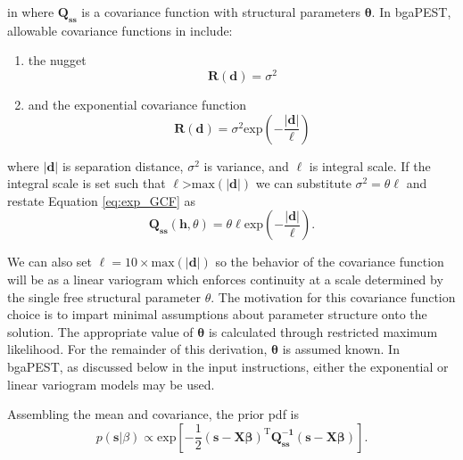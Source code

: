\documentclass[11pt,oneside,onecolumn]{usgsreport}
\begin{document}
\begin{appendix}
\begin{bibunit}
 in
where $\mathbf{Q_{ss}}$ is a covariance function with structural
parameters $\mathbf{\theta}.$ In bgaPEST, allowable covariance functions
 in
include:
\begin{enumerate}
\item the nugget
\[
\mathbf{R}\left(\mathbf{d}\right)=\sigma^{2}
\]

\item and the exponential covariance function 
\begin{equation}
\mathbf{R}(\mathbf{d})=\sigma^{2}\mathrm{exp}(\mathbf{-}\frac{\left|\mathbf{d}\right|}{\ell})\label{eq:exp_GCF}
\end{equation}

\end{enumerate}
where $\left|\mathbf{d}\right|$ is separation distance, $\sigma^{2}$
is variance, and $\ell$ is integral scale. If the integral scale
is set such that $\ell$>$\mathrm{max}(\left|\mathbf{d}\right|)$ we
can substitute $\sigma^{2}=\theta\ell$ and restate Equation \ref{eq:exp_GCF}
as
\begin{equation}
\mathbf{Q_{ss}}(\mathbf{h},\theta)=\theta\ell\mathrm{exp}(-\frac{\mathbf{\left|\mathbf{d}\right|}}{\ell})\label{eq:Qss}.
\end{equation}


We can also set $\ell=10\times\mathrm{max(\mathbf{\left|d\right|})}$
so the behavior of the covariance function will be as a linear variogram
\citep{FienenWRR2008} which enforces continuity at a scale determined
by the single free structural parameter $\theta.$ The motivation
for this covariance function choice is to impart minimal assumptions
about parameter structure onto the solution. The appropriate value
of $\mathbf{\theta}$ is calculated through restricted maximum likelihood.
For the remainder of this derivation, $\mathbf{\theta}$ is assumed
known. In bgaPEST, as discussed below in the input instructions, either
the exponential or linear variogram models may be used.

Assembling the mean and covariance, the prior pdf is
\begin{equation}
p(\mathbf{s}|\beta)\propto\mathrm{exp\left[\mathbf{-}\frac{1}{2}(\mathbf{s-X\beta})^{T}\mathbf{Q_{ss}^{-1}}(\mathbf{s-X\beta})\right]}\label{eq:prior}.
\end{equation}



\end{bibunit}
\end{appendix}
\end{document}

